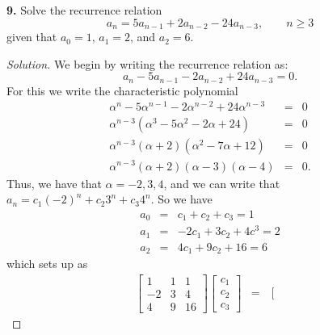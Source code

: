 \documentclass[12pt]{amsart}
\newenvironment{solution}
{\begin{proof}[Solution]}
{\end{proof}}
\begin{document}
\begin{onehalfspace}
        \noindent\textbf{9.} Solve the recurrence relation
        \begin{displaymath}
            a_n = 5a_{n-1} + 2a_{n-2} - 24a_{n-3}, \qquad n \ge 3
        \end{displaymath}
        given that $a_0=1$, $a_1=2$, and $a_2=6$.
        \begin{solution}
            We begin by writing the recurrence relation as:
            \begin{displaymath}
                a_n - 5a_{n-1} - 2a_{n-2} + 24a_{n-3} = 0.
            \end{displaymath}
            For this we write the characteristic polynomial
            \begin{eqnarray*}
                \alpha^n - 5\alpha^{n-1} - 2\alpha^{n-2} + 24\alpha^{n-3} & = & 0\\
                \alpha^{n - 3}(\alpha^3-5\alpha^2-2\alpha+24) & = & 0\\
                \alpha^{n - 3}(\alpha+2)(\alpha^2-7\alpha+12)  & = & 0\\
                \alpha^{n - 3}(\alpha+2)(\alpha-3)(\alpha-4) & = & 0.
            \end{eqnarray*}
            Thus, we have that $\alpha=-2,3,4$, and we can write that $a_n=c_1(-2)^n + c_2 3^n+ c_3 4^n$.
            So we have
            \begin{eqnarray*}
                a_0 & = & c_1 + c_2 + c_3 = 1\\
                a_1 & = & -2c_1 + 3c_2 + 4c^3 = 2\\
                a_2 & = & 4c_1 + 9c_2+16 = 6
            \end{eqnarray*}
            which sets up as
            \begin{eqnarray*}
                \left[\begin{matrix}
                          1 & 1 & 1\\
                          -2 & 3 & 4\\
                          4 & 9 & 16
                \end{matrix}\right]
                \left[\begin{matrix}
                          c_1\\
                          c_2\\
                          c_3
                \end{matrix}\right]
                & = &
                \left[\begin{matrix}

\end{matrix}
\end{eqnarray*}
\end{solution}
\end{onehalfspace}
\end{document}
